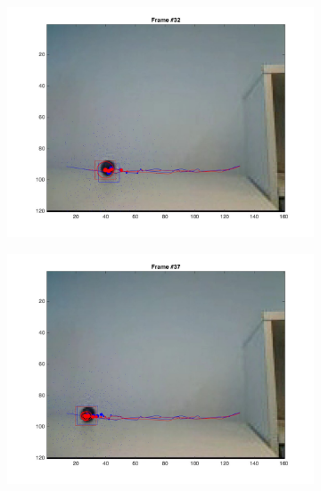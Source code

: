 \documentclass{ethz_report}
\begin{document}
\begin{figure}[h]
\begin{subfigure}[b]{.25\textwidth}
        \includegraphics[width=1\linewidth]{images/video3_particles_high_31}
    \end{subfigure}%
    \begin{subfigure}[b]{.25\textwidth}
        \centering
        \includegraphics[width=1\linewidth]{images/video3_particles_high_36}
    \end{subfigure}
    \begin{subfigure}[b]{.25\textwidth}
        \centering

\end{subfigure}
\end{figure}
\end{document}
